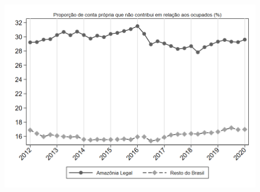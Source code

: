 \begin{frame}[label=_estrutura_emprego_prop_cpropriaNc]{}
\textit{\hyperlink{_estrutura_emprego}{}}
\begin{figure}
  \centering
  \includegraphics[width=1.0\linewidth]{../../analysis/output/estrutura_emprego/_estrutura_emprego_prop_cpropriaNc.png}
  \caption{}
  \label{fig:_estrutura_emprego_prop_cpropriaNc}
\end{figure}
\end{frame}